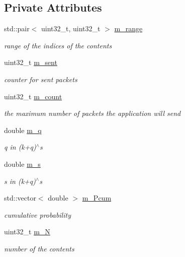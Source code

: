 \subsection*{Private Attributes}
\begin{DoxyCompactItemize}
\item 
std\-::pair$<$ uint32\-\_\-t, uint32\-\_\-t $>$ \hyperlink{classns3_1_1OICNZipfClient_a374afd9b3085995e5fc37befbc593925}{m\-\_\-range}
\begin{DoxyCompactList}\small\item\em range of the indices of the contents \end{DoxyCompactList}\item 
uint32\-\_\-t \hyperlink{classns3_1_1OICNZipfClient_ad8cd34cc29d9ff89702f5c805a58aaf4}{m\-\_\-sent}
\begin{DoxyCompactList}\small\item\em counter for sent packets \end{DoxyCompactList}\item 
uint32\-\_\-t \hyperlink{classns3_1_1OICNZipfClient_ab2cc3b1156fb17d67c19e16526696770}{m\-\_\-count}
\begin{DoxyCompactList}\small\item\em the maximum number of packets the application will send \end{DoxyCompactList}\item 
double \hyperlink{classns3_1_1OICNZipfClient_aa56cf1606f17a1753bb4b066f75d5dcc}{m\-\_\-q}
\begin{DoxyCompactList}\small\item\em q in (k+q)$^\wedge$s \end{DoxyCompactList}\item 
double \hyperlink{classns3_1_1OICNZipfClient_a4bf5ef44d4ee8832da331827774bff10}{m\-\_\-s}
\begin{DoxyCompactList}\small\item\em s in (k+q)$^\wedge$s \end{DoxyCompactList}\item 
std\-::vector$<$ double $>$ \hyperlink{classns3_1_1OICNZipfClient_a1dd636e731bbe2b2273970c3e9c191b7}{m\-\_\-\-Pcum}
\begin{DoxyCompactList}\small\item\em cumulative probability \end{DoxyCompactList}\item 
uint32\-\_\-t \hyperlink{classns3_1_1OICNZipfClient_a4146b87daf72c43e4d9f1e288897e30e}{m\-\_\-\-N}
\begin{DoxyCompactList}\small\item\em number of the contents \end{DoxyCompactList}\item 

\end{DoxyCompactItemize}
